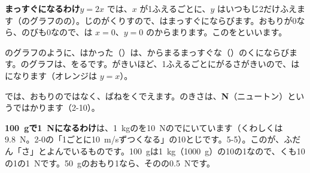 \textbf{まっすぐになるわけ}\quad $y=2x$ では、$x$ が1ふえるごとに、$y$ はいつもじ2だけふえます（のグラフのの）。じのがくりすので、はまっすぐにならびます。おもりが0なら、のびも0なので、は $x=0$、$y=0$ のからまります。このを\textbf{}といいます。

のグラフのように、はかった（）は、からまるまっすぐな（）のくにならびます。のグラフは、をるです。がきいほど、1ふえるごとにがるさがきいので、はになります（オレンジは $y=x$）。


\leavevmode\label{bk:2-15:bane}\noindent\begin{minipage}[t]{0.47\linewidth}\vspace{0pt}
では、おもりのではなく、ばねをくでえます。のきさは、\textbf{N}（ニュートン）というではかります（2-10）。
\end{minipage}\hfill
\begin{minipage}[t]{67mm}\vspace{0pt}\end{minipage}
\par\vspace{4pt}
\textbf{\qty{100}{g}で\qty{1}{N}になるわけ}\quad {}は、\qty{1}{kg}のを\qty{10}{N}のでにいています（くわしくは\qty{9.8}{N}。2-0の「1ごとに\qty{10}{m/s}ずつくなる」の10とじです。5-5）。このが、ふだん「さ」とよんでいるものです。\qty{100}{g}は\qty{1}{kg}（\qty{1000}{g}）の10の1なので、くも10の1の\qty{1}{N}です。\qty{50}{g}のおもり1なら、そのの\qty{0.5}{N}です。

